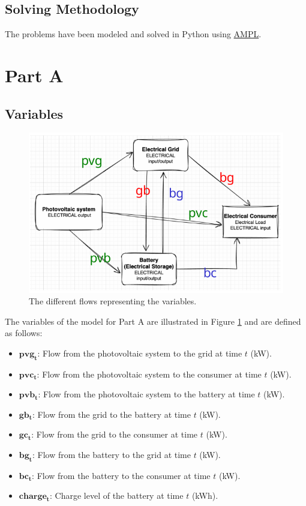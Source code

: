 \documentclass[12pt]{article}
\newcommand{\VAR}[1]{\mathbf{#1}}
\begin{document}
\subsection{Solving Methodology}
The problems have been modeled and solved in Python using \href{https://dev.ampl.com/ampl/python/index.html}{AMPL}.

\section{Part A}

\subsection{Variables}
\begin{figure}[h]
    \centering
    \includegraphics[width=\textwidth]{diagram}
    \caption{The different flows representing the variables.}
    \label{fig:diagram}
\end{figure}

The variables of the model for Part A are illustrated in Figure \ref{fig:diagram} and are defined as follows:
\begin{itemize}
    \item \(\VAR{pvg_t}\): Flow from the photovoltaic system to the grid at time \(t\) (kW).
    \item \(\VAR{pvc_t}\): Flow from the photovoltaic system to the consumer at time \(t\) (kW).
    \item \(\VAR{pvb_t}\): Flow from the photovoltaic system to the battery at time \(t\) (kW).
    \item \(\VAR{gb_t}\): Flow from the grid to the battery at time \(t\) (kW).
    \item \(\VAR{gc_t}\): Flow from the grid to the consumer at time \(t\) (kW).
    \item \(\VAR{bg_t}\): Flow from the battery to the grid at time \(t\) (kW).
    \item \(\VAR{bc_t}\): Flow from the battery to the consumer at time \(t\) (kW).
    \item \(\VAR{charge_t}\): Charge level of the battery at time \(t\) (kWh).
\end{itemize}
\end{document}
